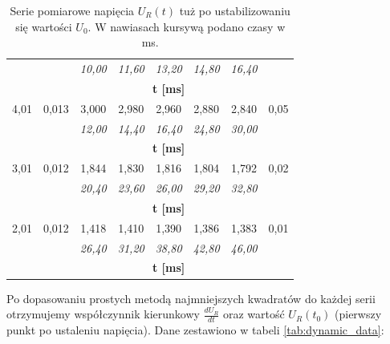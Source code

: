 \documentclass[12pt]{article}
\begin{document}
\begin{table}[H]
\begin{tabular}{c|c|ccccc|c}
                &         & \textit{10{,}00}  & \textit{11{,}60}  & \textit{13{,}20}  & \textit{14{,}80}  & \textit{16{,}40} & \\
                &         & \multicolumn{5}{c}{\textbf{t [ms]}} & \\[6pt]
        \midrule
        4{,}01  & 0{,}013 & 3{,}000  & 2{,}980  & 2{,}960  & 2{,}880  & 2{,}840 & 0{,}05 \\
                &         & \textit{12{,}00}  & \textit{14{,}40}  & \textit{16{,}40}  & \textit{24{,}80}  & \textit{30{,}00} & \\
                &         & \multicolumn{5}{c}{\textbf{t [ms]}} & \\[6pt]
        \midrule
        3{,}01  & 0{,}012 & 1{,}844  & 1{,}830  & 1{,}816  & 1{,}804  & 1{,}792 & 0{,}02 \\
                &         & \textit{20{,}40}  & \textit{23{,}60}  & \textit{26{,}00}  & \textit{29{,}20}  & \textit{32{,}80} & \\
                &         & \multicolumn{5}{c}{\textbf{t [ms]}} & \\[6pt]
        \midrule
        2{,}01  & 0{,}012 & 1{,}418  & 1{,}410  & 1{,}390  & 1{,}386  & 1{,}383 & 0{,}01 \\
                &         & \textit{26{,}40}  & \textit{31{,}20}  & \textit{38{,}80}  & \textit{42{,}80}  & \textit{46{,}00} & \\
                &         & \multicolumn{5}{c}{\textbf{t [ms]}} & \\[6pt]
        \bottomrule
    \end{tabular}
    \caption{Serie pomiarowe napięcia $U_R(t)$ tuż po ustabilizowaniu się wartości $U_0$. W nawiasach kursywą podano czasy w ms.}
    \label{tab:lines_data}
\end{table}

Po dopasowaniu prostych metodą najmniejszych kwadratów do każdej serii otrzymujemy współczynnik kierunkowy $\frac{dU_R}{dt}$ oraz wartość $U_R(t_0)$ (pierwszy punkt po ustaleniu napięcia). Dane zestawiono w tabeli \ref{tab:dynamic_data}:
\end{document}
